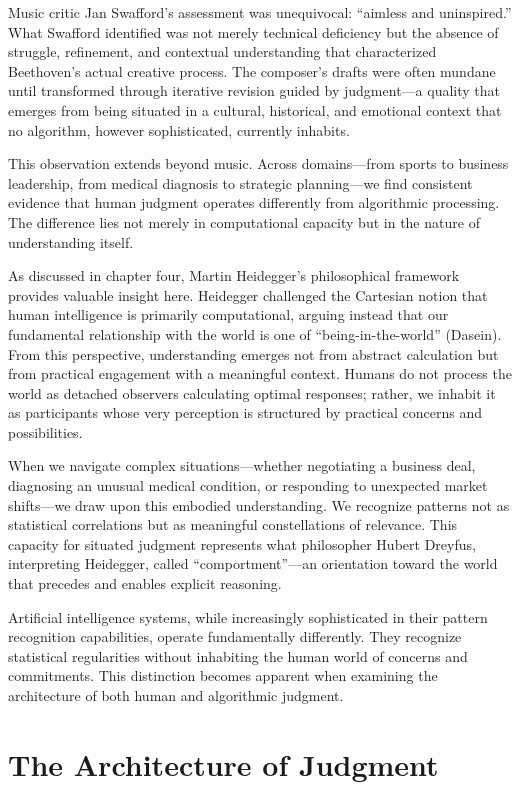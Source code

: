 \documentclass[
  Letterpaper,
]{scrbook}
\begin{document}
Music critic Jan Swafford's assessment was unequivocal: ``aimless and
uninspired.'' What Swafford identified was not merely technical
deficiency but the absence of struggle, refinement, and contextual
understanding that characterized Beethoven's actual creative process.
The composer's drafts were often mundane until transformed through
iterative revision guided by judgment---a quality that emerges from
being situated in a cultural, historical, and emotional context that no
algorithm, however sophisticated, currently inhabits.

This observation extends beyond music. Across domains---from sports to
business leadership, from medical diagnosis to strategic planning---we
find consistent evidence that human judgment operates differently from
algorithmic processing. The difference lies not merely in computational
capacity but in the nature of understanding itself.

As discussed in chapter four, Martin Heidegger's philosophical framework
provides valuable insight here. Heidegger challenged the Cartesian
notion that human intelligence is primarily computational, arguing
instead that our fundamental relationship with the world is one of
``being-in-the-world'' (Dasein). From this perspective, understanding
emerges not from abstract calculation but from practical engagement with
a meaningful context. Humans do not process the world as detached
observers calculating optimal responses; rather, we inhabit it as
participants whose very perception is structured by practical concerns
and possibilities.

When we navigate complex situations---whether negotiating a business
deal, diagnosing an unusual medical condition, or responding to
unexpected market shifts---we draw upon this embodied understanding. We
recognize patterns not as statistical correlations but as meaningful
constellations of relevance. This capacity for situated judgment
represents what philosopher Hubert Dreyfus, interpreting Heidegger,
called ``comportment''---an orientation toward the world that precedes
and enables explicit reasoning.

Artificial intelligence systems, while increasingly sophisticated in
their pattern recognition capabilities, operate fundamentally
differently. They recognize statistical regularities without inhabiting
the human world of concerns and commitments. This distinction becomes
apparent when examining the architecture of both human and algorithmic
judgment.

\section{The Architecture of
Judgment}\label{the-architecture-of-judgment}
\end{document}
